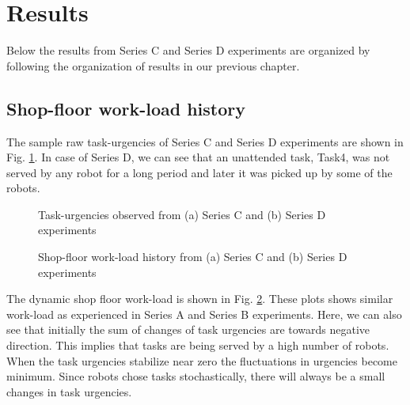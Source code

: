 \section{Results}
\label{sec:results}
Below the results from Series C and Series D experiments are organized by following the organization of results in our previous chapter.
\subsection*{Shop-floor work-load history}
The sample raw task-urgencies of Series C and Series D experiments are shown in Fig. \ref{fig:raw-urgencies-SC-SD}. In case of Series D, we can see that an unattended task, Task4, was not served by any robot for a long period and later it was picked up by some of the robots. 
\begin{figure}
\centering
{}
\caption{\small Task-urgencies observed from (a) Series C and (b) Series D experiments}
\label{fig:raw-urgencies-SC-SD} 
\end{figure}
\begin{figure}
\centering
{}
\caption{\small Shop-floor work-load history from (a) Series C and (b) Series D experiments}
\label{fig:workload-SC-SD} 
\end{figure}
The dynamic shop floor work-load is shown in Fig. \ref{fig:workload-SC-SD}. These plots shows similar work-load as experienced in Series A and Series B experiments. Here, we can also see that initially the sum of changes of task urgencies are towards negative direction. This implies that tasks are being served by a high number of robots. When the task urgencies stabilize near zero the fluctuations in urgencies become minimum. Since robots chose tasks stochastically, there will always be a small changes in task urgencies.\\
%
